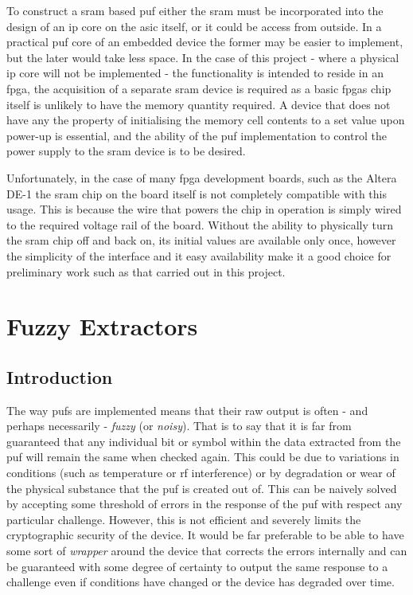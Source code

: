 To construct a \gls{sram} based \gls{puf} either the \gls{sram} must be
incorporated into the design of an \gls{ip} core on the \gls{asic} itself,
or it could be access from outside.
In a practical \gls{puf} core of an embedded device the former may be easier
to implement, but the later would take less space.
In the case of this project - where a physical \gls{ip} core will not be
implemented - the functionality is intended to reside in an \gls{fpga},
the acquisition of a separate \gls{sram} device is required as a basic
\glspl{fpga} chip itself is unlikely to have the memory quantity required.
A device that does not have any the property of initialising the memory cell
contents to a set value upon power-up is essential, and the
ability of the \gls{puf} implementation to control the power supply to the 
\gls{sram} device is to be desired.

Unfortunately, in the case of many \gls{fpga} development boards, such as the
Altera DE-1\cite{altera2006usermanual} the \gls{sram} chip on the board itself
is not completely compatible with this usage.
This is because the wire that powers the chip in operation is simply wired to
the required voltage rail of the board.
Without the ability to physically turn the \gls{sram} chip off and back on,
its initial values are available only once, however the simplicity of the
interface and it easy availability make it a good choice for preliminary work
such as that carried out in this project.

\section{Fuzzy Extractors}

\subsection{Introduction}

The way \glspl{puf} are implemented means that their raw
output is often - and perhaps necessarily - \emph{fuzzy} (or \emph{noisy}).
That is to say that it is far from guaranteed that any individual bit or
symbol within the data extracted from the \gls{puf} will remain the same when checked
again.
This could be due to variations in conditions (such as temperature or \gls{rf} interference) or by degradation or wear of the physical substance that the
\gls{puf} is created out of.
This can be naively solved by accepting some threshold of errors in the response
of the \gls{puf} with respect any particular challenge.
However, this is not efficient and severely limits the cryptographic security
of the device.
It would be far preferable to be able to have some sort of \emph{wrapper}
around the device that corrects the errors internally and can be guaranteed
with some degree of certainty to output the same response to a challenge even
if conditions have changed or the device has degraded over time.

